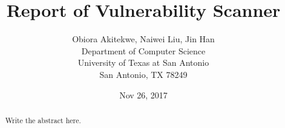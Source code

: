 \documentclass[11pt]{article}
\begin{document}
\title{Report of Vulnerability Scanner}

\author{Obiora Akitekwe, Naiwei Liu, Jin Han\\
        Department of Computer Science\\
        University of Texas at San Antonio\\
        San Antonio, TX 78249}

\date{Nov 26, 2017}
\maketitle 

\begin{abstract}
Write the abstract here.
\end{abstract}
















\end{document}
